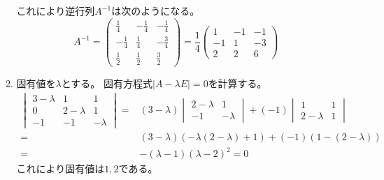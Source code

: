 \documentclass[12pt,b5paper]{ltjsarticle}
\begin{document}
\begin{enumerate}
\begin{enumerate}
            これにより逆行列$A^{-1}$は次のようになる。
            \begin{equation}
             A^{-1} =
             \begin{pmatrix}
              \frac{1}{4} & - \frac{1}{4} & - \frac{1}{4}\\
              - \frac{1}{4}& \frac{1}{4} & - \frac{3}{4}\\
              \frac{1}{2} & \frac{1}{2}& \frac{3}{2}
             \end{pmatrix}
             = \frac{1}{4}
             \begin{pmatrix}
              1 & -1 & -1\\
              -1 & 1 & -3\\
              2 & 2 & 6
             \end{pmatrix}
            \end{equation}
       \item
            固有値を$\lambda$とする。
            固有方程式$\lvert A - \lambda E \rvert =0$を計算する。
            \begin{align}
             \begin{vmatrix}
              3-\lambda & 1 & 1\\
              0 & 2-\lambda & 1\\
              -1 & -1 & -\lambda
             \end{vmatrix}
             =&(3-\lambda)
             \begin{vmatrix}
              2-\lambda & 1\\
              -1 & -\lambda
             \end{vmatrix}
             + (-1)
             \begin{vmatrix}
              1 & 1\\
              2-\lambda & 1
             \end{vmatrix}\\
             =& (3-\lambda)(-\lambda(2-\lambda)+1)+(-1)(1-(2-\lambda))\\
             =& -(\lambda - 1)(\lambda - 2)^2 =0
            \end{align}
            これにより固有値は$1,2$である。



\end{enumerate}
\end{enumerate}
\end{document}
